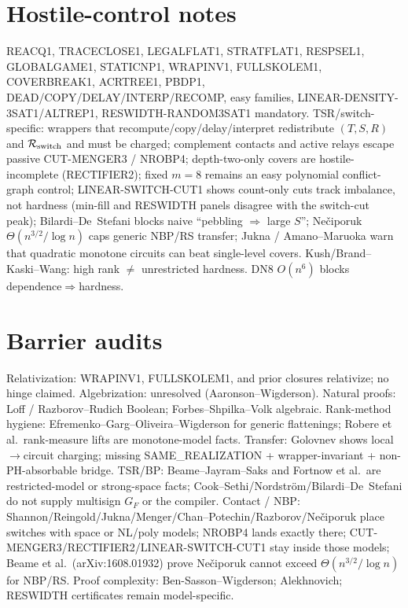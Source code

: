 \documentclass[11pt]{article}
\begin{document}
\section*{Hostile-control notes}
REACQ1, TRACECLOSE1, LEGALFLAT1, STRATFLAT1, RESPSEL1, GLOBALGAME1, STATICNP1, WRAPINV1,
FULLSKOLEM1, COVERBREAK1, ACRTREE1, PBDP1, DEAD/COPY/DELAY/INTERP/RECOMP, easy families,
LINEAR-DENSITY-3SAT1/ALTREP1, RESWIDTH-RANDOM3SAT1 mandatory.
TSR/switch-specific: wrappers that recompute/copy/delay/interpret redistribute $(T,S,R)$ and
$\mathcal R_{\rm switch}$ and must be charged; complement contacts and active relays escape
passive CUT-MENGER3 / NROBP4; depth-two-only covers are hostile-incomplete (RECTIFIER2);
fixed $m=8$ remains an easy polynomial conflict-graph control;
LINEAR-SWITCH-CUT1 shows count-only cuts track imbalance, not hardness (min-fill and RESWIDTH
panels disagree with the switch-cut peak);
Bilardi--De~Stefani blocks naive ``pebbling $\Rightarrow$ large $S$'';
Ne\v{c}iporuk $\Theta(n^{3/2}/\log n)$ caps generic NBP/RS transfer;
Jukna / Amano--Maruoka warn that quadratic monotone circuits can beat single-level covers.
Kush/Brand--Kaski--Wang: high rank $\neq$ unrestricted hardness.
DN8 $O(n^6)$ blocks dependence$\Rightarrow$hardness.

\section*{Barrier audits}
Relativization: WRAPINV1, FULLSKOLEM1, and prior closures relativize; no hinge claimed.
Algebrization: unresolved (Aaronson--Wigderson).
Natural proofs: Loff / Razborov--Rudich Boolean; Forbes--Shpilka--Volk algebraic.
Rank-method hygiene: Efremenko--Garg--Oliveira--Wigderson for generic flattenings;
Robere et al.\ rank-measure lifts are monotone-model facts.
Transfer: Golovnev shows local$\to$circuit charging; missing SAME\_REALIZATION + wrapper-invariant
+ non-PH-absorbable bridge.
TSR/BP: Beame--Jayram--Saks and Fortnow et al.\ are restricted-model or strong-space facts;
Cook--Sethi/Nordstr\"om/Bilardi--De~Stefani do not supply multisign $G_F$ or the compiler.
Contact / NBP: Shannon/Reingold/Jukna/Menger/Chan--Potechin/Razborov/Ne\v{c}iporuk place switches
with space or NL/poly models; NROBP4 lands exactly there; CUT-MENGER3/RECTIFIER2/LINEAR-SWITCH-CUT1
stay inside those models; Beame et al.\ (arXiv:1608.01932) prove Ne\v{c}iporuk cannot exceed
$\Theta(n^{3/2}/\log n)$ for NBP/RS.
Proof complexity: Ben-Sasson--Wigderson; Alekhnovich; RESWIDTH certificates remain model-specific.
\end{document}
